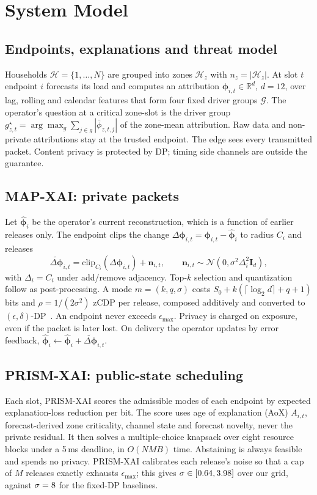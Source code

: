 \documentclass[conference]{IEEEtran}
\newcommand{\method}{PRISM-XAI}
\newcommand{\mapxai}{MAP-XAI}
\begin{document}
\section{System Model}\label{sec:system}
\subsection{Endpoints, explanations and threat model}
Households $\mathcal H=\{1,\dots,N\}$ are grouped into zones $\mathcal H_z$ with
$n_z=|\mathcal H_z|$. At slot $t$ endpoint $i$ forecasts its load and computes an
attribution $\bm\phi_{i,t}\in\mathbb R^{d}$, $d=12$, over lag, rolling and
calendar features that form four fixed driver groups $\mathcal G$. The operator's
question at a critical zone-slot is the driver group
$g^\star_{z,t}=\arg\max_{g}\sum_{j\in g}|\bar\phi_{z,t,j}|$ of the zone-mean
attribution. Raw data and non-private attributions stay at the trusted endpoint.
The edge sees every transmitted packet. Content privacy is protected by DP;
timing side channels are outside the guarantee.

\subsection{\mapxai{}: private packets}
Let $\hat{\bm\phi}_{i}$ be the operator's current reconstruction, which is a
function of earlier releases only. The endpoint clips the change
$\Delta\bm\phi_{i,t}=\bm\phi_{i,t}-\hat{\bm\phi}_{i}$ to radius $C_i$ and releases
\begin{equation}
\widetilde{\Delta\bm\phi}_{i,t}=\mathrm{clip}_{C_i}(\Delta\bm\phi_{i,t})+\bm n_{i,t},\qquad
\bm n_{i,t}\sim\mathcal N(0,\sigma^2\Delta_i^2\bm I_d),\label{eq:gauss}
\end{equation}
with $\Delta_i=C_i$ under add/remove adjacency. Top-$k$ selection and
quantization follow as post-processing. A mode $m=(k,q,\sigma)$ costs
$S_0+k(\lceil\log_2 d\rceil+q+1)$ bits and $\rho=1/(2\sigma^2)$ zCDP per release,
composed additively and converted to $(\epsilon,\delta)$-DP~\cite{bun2016zcdp}. An
endpoint never exceeds $\epsilon_{\max}$. Privacy is charged on exposure, even if
the packet is later lost. On delivery the operator updates by error feedback,
$\hat{\bm\phi}_i\leftarrow\hat{\bm\phi}_i+\widetilde{\Delta\bm\phi}_{i,t}$.

\subsection{\method{}: public-state scheduling}
Each slot, \method{} scores the admissible modes of each endpoint by expected
explanation-loss reduction per bit. The score uses age of explanation (AoX)
$A_{i,t}$, forecast-derived zone criticality, channel state and forecast novelty,
never the private residual. It then solves a multiple-choice knapsack over
eight resource blocks under a 5\,ms deadline, in $O(NMB)$ time. Abstaining is
always feasible and spends no privacy. \method{} calibrates each release's noise
so that a cap of $M$ releases exactly exhausts $\epsilon_{\max}$; this gives
$\sigma\in[0.64,3.98]$ over our grid, against $\sigma=8$ for
the fixed-DP baselines.
\end{document}
